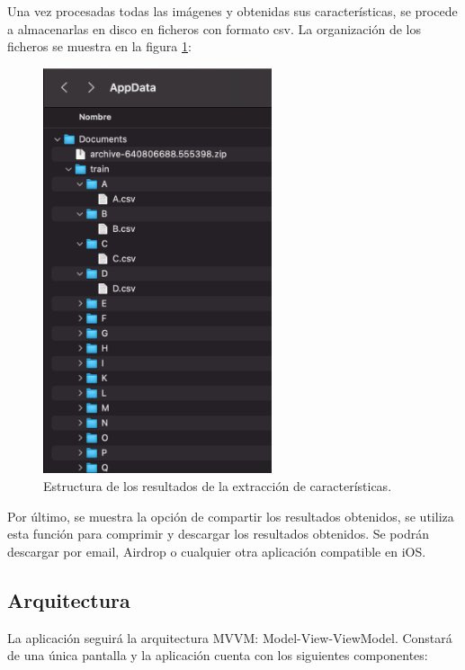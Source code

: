 \documentclass[../main.tex]{subfiles}
\begin{document}
    Una vez procesadas todas las imágenes y obtenidas sus características, se procede a almacenarlas en disco en ficheros con formato csv. La organización de los ficheros se muestra en la figura \ref{figure5}:
    
    \begin{figure}[h]
    \centering 
    \includegraphics[width=0.6\textwidth]{images/trainingapp/estructura-training-results.PNG}
    \caption{Estructura de los resultados de la extracción de características.}
    \label{figure5}
    \end{figure}
    
    Por último, se muestra la opción de compartir los resultados obtenidos, se utiliza esta función para comprimir y descargar los resultados obtenidos. Se podrán descargar por email, Airdrop o cualquier otra aplicación compatible en iOS.
    
\subsection{Arquitectura}

La aplicación seguirá la arquitectura MVVM: Model-View-ViewModel. Constará de una única pantalla y la aplicación cuenta con los siguientes componentes:
\end{document}
